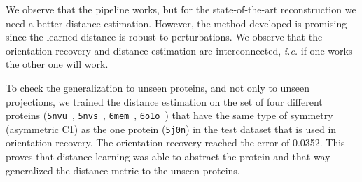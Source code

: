 We observe that the pipeline works, but for the state-of-the-art reconstruction we need a better distance estimation.
However, the method developed is promising since the learned distance is robust to perturbations.
We observe that the orientation recovery and distance estimation are interconnected, \textit{i.e.} if one works the other one will work.

To check the generalization to unseen proteins, and not only to  unseen projections, we trained the distance estimation on the set of four different proteins (\texttt{5nvu}~\cite{5nvu_pdb}, \texttt{5nvs}~\cite{5nvs_pdb}, \texttt{6mem}~\cite{6mem_pdb}, \texttt{6o1o}~\cite{6o1o_pdb}) that have the same type of symmetry (asymmetric  C1) as the one protein (\texttt{5j0n}) in the test dataset that is used in orientation recovery.
The orientation recovery reached the error of 0.0352.
This proves that distance learning was able to abstract the protein and that way generalized the distance metric to the unseen proteins.
